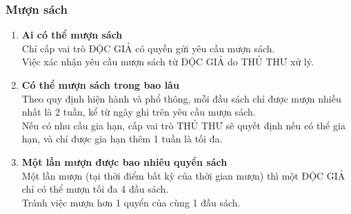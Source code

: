 \documentclass[12pt,a4paper]{report}
\begin{document}
            \subsubsection{Mượn sách}
                \begin{enumerate}
                \item \textbf{Ai có thể mượn sách}\\
                Chỉ cấp vai trò ĐỘC GIẢ có quyền gửi yêu cầu mượn sách.\\
                Việc xác nhận yêu cầu mượn sách từ ĐỘC GIẢ do THỦ THƯ xử lý.\\
                \item \textbf{Có thể mượn sách trong bao lâu}\\
                Theo quy định hiện hành và phổ thông, mỗi đầu sách chỉ được mượn nhiều nhất là 2 tuần, kể từ ngày ghi trên yêu cầu mượn sách.\\
                Nếu có nhu cầu gia hạn, cấp vai trò THỦ THƯ sẽ quyết định nếu có thể gia hạn, và chỉ được gia hạn thêm 1 tuần là tối đa.\\
                \item \textbf{Một lần mượn được bao nhiêu quyển sách}\\
                Một lần mượn (tại thời điểm bất kỳ của thời gian mượn) thì một ĐỘC GIẢ chỉ có thể mượn tối đa 4 đầu sách.\\
                Tránh việc mượn hơn 1 quyển của cùng 1 đầu sách.\\
                \end{enumerate}
\end{document}

